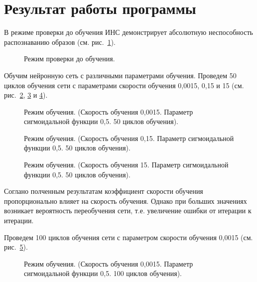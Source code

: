 \section{Результат работы программы}


В режиме проверки  до обучения ИНС демонстрирует абсолютную неспособность распознаванию образов (см. рис.~\ref{ris:Check}).

\begin{figure}[h]
\caption{Режим проверки до обучения.}
\label{ris:Check}
\end{figure}

Обучим нейронную сеть с различными параметрами обучения.
Проведем 50 циклов обучения сети с параметрами скорости обучения 0,0015, 0,15 и 15 (см. рис.~\ref{ris:stud_0,0015_0,5_50}, \ref{ris:stud_0,15_0,5_50} и \ref{ris:stud_15_0,5_50}).

\begin{figure}[H]
\caption{Режим обучения. (Скорость обучения 0,0015. Параметр сигмоидальной функции 0,5. 50 циклов обучения).}
\label{ris:stud_0,0015_0,5_50}
\end{figure}

\begin{figure}[H]
\caption{Режим обучения. (Скорость обучения 0,15. Параметр сигмоидальной функции 0,5. 50 циклов обучения).}
\label{ris:stud_0,15_0,5_50}
\end{figure}

\begin{figure}[H]
\caption{Режим обучения. (Скорость обучения 15. Параметр сигмоидальной функции 0,5. 50 циклов обучения).}
\label{ris:stud_15_0,5_50}
\end{figure}

Соглано полченным результатам коэффициент скорости обучения пропорционально влияет на скорость обучения. 
Однако при больших значениях возникает вероятность переобучения сети, т.е. увеличение ошибки от итерации к итерации.


Проведем 100 циклов обучения сети с параметром скорости обучения 0,0015 (см. рис.~\ref{ris:stud_0,0015_0,5_100}).

\begin{figure}[h]
\caption{Режим обучения. (Скорость обучения 0,0015. Параметр сигмоидальной функции 0,5. 100 циклов обучения).}
\label{ris:stud_0,0015_0,5_100}
\end{figure}

